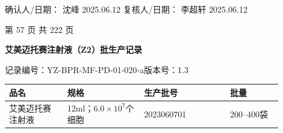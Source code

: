 \documentclass[UTF8,10pt,a4paper,fontset=fandol]{ctexart}
\newcommand{\fieldvalue}[1]{#1}
\newcommand{\handwritten}[1]{#1}
\begin{document}
\noindent
确认人/日期：
\fieldvalue{\handwritten{沈峰}}
\quad
\fieldvalue{\handwritten{2025.06.12}}
\hfill
复核人/日期：
\fieldvalue{\handwritten{李超轩}}
\quad
\fieldvalue{\handwritten{2025.06.12}}

\begin{center}
第 57 页 共 222 页
\end{center}

\newpage

\begin{center}
\textbf{艾美迈托赛注射液（Z2）批生产记录}
\end{center}

记录编号：YZ-BPR-MF-PD-01-020-a\qquad 版本号：1.3

\begin{tabular}{|p{0.19\linewidth}|p{0.25\linewidth}|p{0.29\linewidth}|p{0.17\linewidth}|}
\hline
品名 & 规格 & 生产批号 & 批量 \\
\hline
\fieldvalue{艾美迈托赛注射液} &
\fieldvalue{12ml；$6.0\times10^{7}$个细胞} &
\fieldvalue{\handwritten{2023060701}} &
\fieldvalue{200--400袋} \\
\hline
\end{tabular}

\vspace{0.3em}
\end{document}
